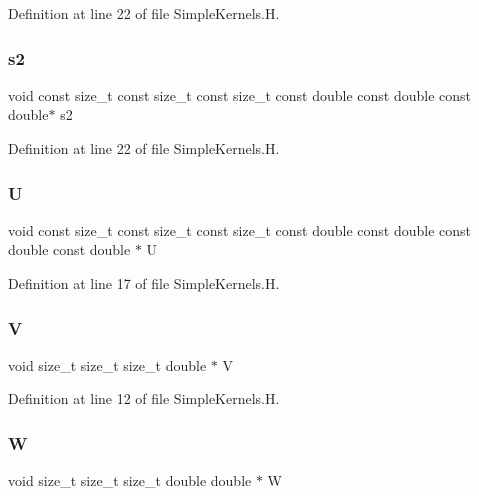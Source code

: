 Definition at line 22 of file Simple\+Kernels.\+H.

\hypertarget{SimpleKernels_8H_a50ce1cee1a1ec9524c1fc05834b4393f}{}\label{SimpleKernels_8H_a50ce1cee1a1ec9524c1fc05834b4393f} 
\subsubsection{\texorpdfstring{s2}{s2}}
{\footnotesize\ttfamily void const size\+\_\+t const size\+\_\+t const size\+\_\+t const double const double const double$\ast$ s2}



Definition at line 22 of file Simple\+Kernels.\+H.

\hypertarget{SimpleKernels_8H_aca4ab6143606c908fb1a7de286ddddae}{}\label{SimpleKernels_8H_aca4ab6143606c908fb1a7de286ddddae} 
\subsubsection{\texorpdfstring{U}{U}}
{\footnotesize\ttfamily void const size\+\_\+t const size\+\_\+t const size\+\_\+t const double const double const double const double $\ast$ U}



Definition at line 17 of file Simple\+Kernels.\+H.

\hypertarget{SimpleKernels_8H_afbd617fe026d7bc5c305ad678d156dbe}{}\label{SimpleKernels_8H_afbd617fe026d7bc5c305ad678d156dbe} 
\subsubsection{\texorpdfstring{V}{V}}
{\footnotesize\ttfamily void size\+\_\+t size\+\_\+t size\+\_\+t double $\ast$ V}



Definition at line 12 of file Simple\+Kernels.\+H.

\hypertarget{SimpleKernels_8H_a47539bc7159e013320007f51fcbf1fe3}{}\label{SimpleKernels_8H_a47539bc7159e013320007f51fcbf1fe3} 
\subsubsection{\texorpdfstring{W}{W}}
{\footnotesize\ttfamily void size\+\_\+t size\+\_\+t size\+\_\+t double double $\ast$ W}



